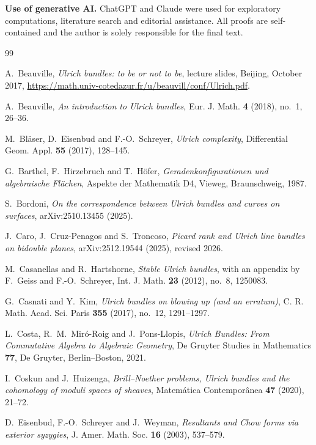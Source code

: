 \documentclass[11pt]{article}
\begin{document}
\medskip
\noindent\textbf{Use of generative AI.}
ChatGPT and Claude were used for exploratory computations, literature search and editorial assistance. All proofs are self-contained and the author is solely responsible for the final text.

\begin{thebibliography}{99}

A.~Beauville,
\emph{Ulrich bundles: to be or not to be},
lecture slides, Beijing, October 2017,
\url{https://math.univ-cotedazur.fr/u/beauvill/conf/Ulrich.pdf}.

A.~Beauville,
\emph{An introduction to Ulrich bundles},
Eur. J. Math. \textbf{4} (2018), no.~1, 26--36.

M.~Bl\"aser, D.~Eisenbud and F.-O.~Schreyer,
\emph{Ulrich complexity},
Differential Geom. Appl. \textbf{55} (2017), 128--145.

G.~Barthel, F.~Hirzebruch and T.~H\"ofer,
\emph{Geradenkonfigurationen und algebraische Fl\"achen},
Aspekte der Mathematik D4, Vieweg, Braunschweig, 1987.

S.~Bordoni,
\emph{On the correspondence between Ulrich bundles and curves on surfaces},
arXiv:2510.13455 (2025).

J.~Caro, J.~Cruz-Penagos and S.~Troncoso,
\emph{Picard rank and Ulrich line bundles on bidouble planes},
arXiv:2512.19544 (2025), revised 2026.

M.~Casanellas and R.~Hartshorne,
\emph{Stable Ulrich bundles}, with an appendix by F.~Geiss and F.-O.~Schreyer,
Int. J. Math. \textbf{23} (2012), no.~8, 1250083.

G.~Casnati and Y.~Kim,
\emph{Ulrich bundles on blowing up (and an erratum)},
C. R. Math. Acad. Sci. Paris \textbf{355} (2017), no.~12, 1291--1297.

L.~Costa, R.~M.~Mir\'o-Roig and J.~Pons-Llopis,
\emph{Ulrich Bundles: From Commutative Algebra to Algebraic Geometry},
De Gruyter Studies in Mathematics \textbf{77}, De Gruyter, Berlin--Boston, 2021.

I.~Coskun and J.~Huizenga,
\emph{Brill--Noether problems, Ulrich bundles and the cohomology of moduli spaces of sheaves},
Matem\'atica Contempor\^anea \textbf{47} (2020), 21--72.

D.~Eisenbud, F.-O.~Schreyer and J.~Weyman,
\emph{Resultants and Chow forms via exterior syzygies},
J. Amer. Math. Soc. \textbf{16} (2003), 537--579.


\end{thebibliography}
\end{document}
